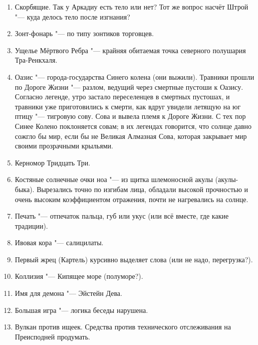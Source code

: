 \documentclass[a4paper,10pt]{book}
\begin{document}
\begin{enumerate}

\item Скорбящие. Так у Аркадиу есть тело или нет? Тот же вопрос насчёт Штрой "--- куда делось тело после изгнания?

\item Зонт-фонарь "--- по типу зонтиков торговцев.

\item Ущелье Мёртвого Ребра "--- крайняя обитаемая точка северного полушария Тра-Ренкхаля.

\item Оазис "--- города-государства Синего колена (они выжили). Травники прошли по Дороге Жизни "--- разлом, ведущий через смертные пустоши к Оазису. Согласно легенде, утро застало переселенцев в смертных пустошах, и травники уже приготовились к смерти, как вдруг увидели летящую на юг птицу "--- тигровую сову. Сова и вывела племя к Дороге Жизни. С тех пор Синее Колено поклоняется совам; в их легендах говорится, что солнце давно сожгло бы мир, если бы не Великая Алмазная Сова, которая закрывает мир своими прозрачными крыльями.

\item Керномор Тридцать Три.

\item Костяные солнечные очки ноа "--- из щитка шлемоносной акулы (акулы-быка). Вырезались точно по изгибам лица, обладали высокой прочностью и очень высоким коэффициентом отражения, почти не нагревались на солнце.

\item Печать "--- отпечаток пальца, губ или укус (или всё вместе, где какие традиции).

\item Ивовая кора "--- салицилаты.

\item Первый жрец (Картель) курсивно выделяет слова (или не надо, перегрузка?).

\item Коллизия "--- Кипящее море (полуморе?).

\item Имя для демона "--- Эйстейн Дева.

\item Большая игра "--- логика беседы нарушена.

\item Вулкан против ищеек. Средства против технического отслеживания на Преисподней продумать.


\end{enumerate}
\end{document}
